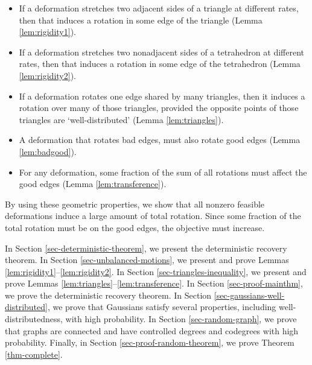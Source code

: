 \begin{itemize}
\item If a deformation stretches two adjacent sides of a triangle at different rates, then that induces a rotation in some edge %
of the triangle (Lemma \ref{lem:rigidity1}).  
\item  If a deformation stretches two nonadjacent sides of a tetrahedron at different rates, then that induces a rotation in some edge %
of the tetrahedron (Lemma \ref{lem:rigidity2}).
\item If a deformation rotates one edge shared by many triangles, then it induces a rotation over many of those triangles, provided the opposite points of those triangles are `well-distributed' (Lemma \ref{lem:triangles}).
\item A deformation that rotates bad edges, must also rotate good edges (Lemma \ref{lem:badgood}).
\item For any deformation, some fraction of the sum of all rotations must  affect the good edges (Lemma \ref{lem:transference}).
\end{itemize}
By using these geometric properties, we show that all nonzero feasible deformations induce a
large amount of total rotation. Since some fraction of the total rotation must be on the good edges,  the objective must increase. 

In Section \ref{sec-deterministic-theorem}, we present the deterministic recovery theorem.  In Section \ref{sec-unbalanced-motions}, we present and prove Lemmas \ref{lem:rigidity1}--\ref{lem:rigidity2}.  In Section \ref{sec-triangles-inequality}, we present and prove Lemmas \ref{lem:triangles}--\ref{lem:transference}.  In Section \ref{sec-proof-mainthm}, we prove the deterministic recovery theorem.  In Section \ref{sec-gaussians-well-distributed}, we prove that Gaussians satisfy several properties, including well-distributedness, with high probability.  In Section \ref{sec-random-graph}, we prove that \erdosrenyi graphs are connected and have controlled degrees and codegrees with high probability.  Finally, in Section \ref{sec-proof-random-theorem}, we prove Theorem \ref{thm-complete}.




%

